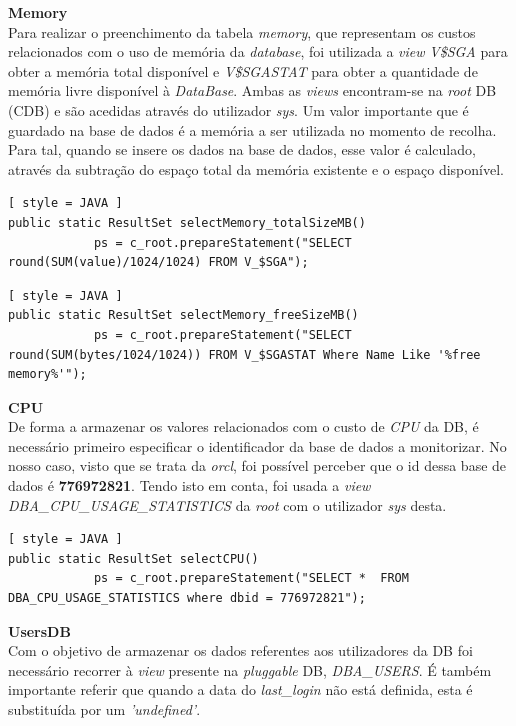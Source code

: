 \documentclass[a4paper]{article}
\begin{document}
\textbf{\large Memory}\\

Para realizar o preenchimento da tabela \emph{memory}, que representam os custos relacionados com o uso de memória da \emph{database}, foi utilizada a \emph{view} \emph{V\$SGA} para obter a memória total disponível e \emph{V\$SGASTAT} para obter a quantidade de memória livre disponível à \emph{DataBase}. Ambas as \emph{views} encontram-se na \emph{root} DB (CDB) e são acedidas através do utilizador \emph{sys}. 
Um valor importante que é guardado na base de dados é a memória a ser utilizada no momento de recolha. Para tal, quando se insere os dados na base de dados, esse valor é calculado, através da subtração do espaço total da memória existente e o espaço disponível.

\begin{lstlisting}[ style = JAVA ]
public static ResultSet selectMemory_totalSizeMB() 
            ps = c_root.prepareStatement("SELECT round(SUM(value)/1024/1024) FROM V_$SGA");

\end{lstlisting}

\begin{lstlisting}[ style = JAVA ]
public static ResultSet selectMemory_freeSizeMB() 
            ps = c_root.prepareStatement("SELECT round(SUM(bytes/1024/1024)) FROM V_$SGASTAT Where Name Like '%free memory%'");

\end{lstlisting}

\textbf{\large CPU}\\

De forma a armazenar os valores relacionados com o custo de \emph{CPU} da DB, é necessário primeiro especificar o identificador da base de dados a monitorizar. No nosso caso, visto que se trata da \emph{orcl}, foi possível perceber que o id dessa base de dados é \textbf{776972821}. Tendo isto em conta, foi usada a \emph{view} \emph{DBA\_CPU\_USAGE\_STATISTICS} da \emph{root} com o utilizador \emph{sys} desta.

\begin{lstlisting}[ style = JAVA ]
public static ResultSet selectCPU() 
            ps = c_root.prepareStatement("SELECT *  FROM DBA_CPU_USAGE_STATISTICS where dbid = 776972821");

\end{lstlisting}


\textbf{\large UsersDB}\\

Com o objetivo de armazenar os dados referentes aos utilizadores da DB foi necessário recorrer à \emph{view} presente na \emph{pluggable} DB, \emph{DBA\_USERS}. É também importante referir que quando a data do \emph{last\_login} não está definida, esta é substituída por um \emph{'undefined'}.
\end{document}
